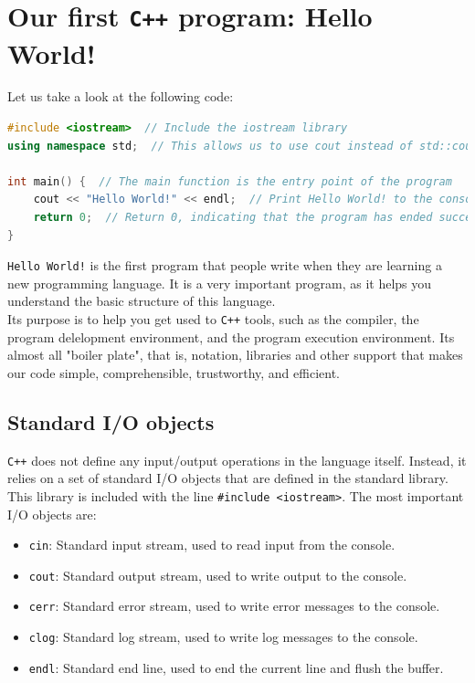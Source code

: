 \section{Our first \texttt{C++} program: Hello World!}

Let us take a look at the following code:


\begin{lstlisting}[language=C++]
#include <iostream>  // Include the iostream library
using namespace std;  // This allows us to use cout instead of std::cout

int main() {  // The main function is the entry point of the program
    cout << "Hello World!" << endl;  // Print Hello World! to the console
    return 0;  // Return 0, indicating that the program has ended successfully
}
\end{lstlisting}

\texttt{Hello World!} is the first program that people write when they are learning a 
new programming language. It is a very important program, as it helps you understand the 
basic structure of this language.\\

Its purpose is to help you get used to \texttt{C++} tools, such as the compiler, the 
program delelopment environment, and the program execution environment. Its almost all 
"boiler plate", that is, notation, libraries and other support that makes our code simple, 
comprehensible, trustworthy, and efficient.\\

\subsection{Standard I/O objects}

\texttt{C++} does not define any input/output operations in the language itself. Instead,
it relies on a set of standard I/O objects that are defined in the standard library. This
library is included with the line \texttt{\#include <iostream>}. The most important I/O
objects are:

\begin{itemize}
    \item \texttt{cin}: Standard input stream, used to read input from the console.
    \item \texttt{cout}: Standard output stream, used to write output to the console.
    \item \texttt{cerr}: Standard error stream, used to write error messages to the console.
    \item \texttt{clog}: Standard log stream, used to write log messages to the console.
    \item \texttt{endl}: Standard end line, used to end the current line and flush the buffer.
\end{itemize}

